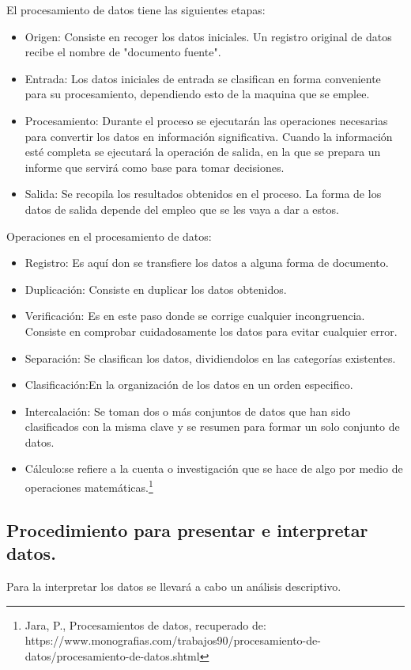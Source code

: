 \documentclass[12pt]{report}%
\begin{document}
El procesamiento de datos tiene las siguientes etapas:
\begin{itemize}
\item Origen: Consiste en recoger los datos iniciales. Un registro original de datos recibe el nombre de "documento fuente".
\item Entrada: Los datos iniciales de entrada se clasifican en forma conveniente para su procesamiento, dependiendo esto de la maquina que se emplee.
\item Procesamiento: Durante el proceso se ejecutarán las operaciones necesarias para convertir los datos en información significativa. Cuando la información esté completa se ejecutará la operación de salida, en la que se prepara un informe que servirá como base para tomar decisiones.
\item Salida: Se recopila los resultados obtenidos en el proceso. La forma de los datos de salida depende del empleo que se les vaya a dar a estos.
\end{itemize}


Operaciones en el procesamiento de datos: 


\begin{itemize}
 \item Registro: Es aquí don se transfiere los datos a alguna forma de documento.
\item Duplicación: Consiste en duplicar los datos obtenidos.
\item Verificación: Es en este paso donde se corrige cualquier incongruencia. Consiste en comprobar cuidadosamente los datos para evitar cualquier error.
\item Separación: Se clasifican los datos, dividiendolos en las categorías existentes.
\item Clasificación:En la organización de los datos en un orden especifico.
\item Intercalación: Se toman dos o más conjuntos de datos que han sido clasificados con la misma clave y se resumen para formar un solo conjunto de datos.
\item Cálculo:se refiere a la cuenta o investigación que se hace de algo por medio de operaciones matemáticas.\footnote{Jara, P., Procesamientos de datos, recuperado de: https://www.monografias.com/trabajos90/procesamiento-de-datos/procesamiento-de-datos.shtml}
\end{itemize}



\subsection{Procedimiento para presentar e interpretar datos.}
Para la interpretar los datos se llevará a cabo un análisis descriptivo.
\end{document}
